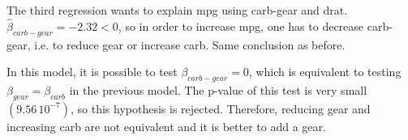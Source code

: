 \documentclass[12pt]{article}
\begin{document}
\begin{enumerate}
The third regression wants to explain mpg using carb-gear and drat. $\hat{\beta}_{carb-gear} = -2.32 < 0$, so in order to increase mpg, one has to decrease carb-gear, i.e. to reduce gear or increase carb. Same conclusion as before. 

In this model, it is possible to test $\beta_{carb-gear} = 0$, which is equivalent to testing $\beta_{gear} = \beta_{carb}$ in the previous model. The p-value of this test is very small $(9.56 \, 10^{-7})$, so this hypothesis is rejected. Therefore, reducing gear and increasing carb are not equivalent and it is better to add a gear.


\end{enumerate}
\end{document}
